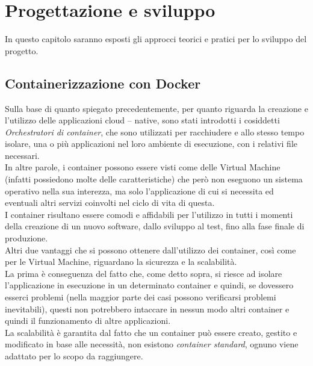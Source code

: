\chapter{Progettazione e sviluppo}\label{chap:progettazionesviluppo}
In questo capitolo saranno esposti gli approcci teorici e pratici per lo sviluppo del progetto.

\section{Containerizzazione con Docker}\label{sec:ContDocker}
Sulla base di quanto spiegato precedentemente, per quanto riguarda la creazione e l'utilizzo delle applicazioni cloud – native, sono stati introdotti i cosiddetti \emph{Orchestratori di container}, che sono utilizzati per racchiudere e allo stesso tempo isolare, una o più applicazioni nel loro ambiente di esecuzione, con i relativi file necessari.\\
In altre parole, i container possono essere visti come delle Virtual Machine (infatti possiedono molte delle caratteristiche) che però non eseguono un sistema operativo nella sua interezza, ma solo l'applicazione di cui si necessita ed eventuali altri servizi coinvolti nel ciclo di vita di questa.\\
I container risultano essere comodi e affidabili per l'utilizzo in tutti i momenti della creazione di un nuovo software, dallo sviluppo al test, fino alla fase finale di produzione.\\
Altri due vantaggi che si possono ottenere dall'utilizzo dei container, così come per le Virtual Machine, riguardano la sicurezza e la scalabilità.\\
La prima è conseguenza del fatto che, come detto sopra, si riesce ad isolare l'applicazione in esecuzione in un determinato container e quindi, se dovessero esserci problemi (nella maggior parte dei casi possono verificarsi problemi inevitabili), questi non potrebbero intaccare in nessun modo altri container e quindi il funzionamento di altre applicazioni.\\
La scalabilità è garantita dal fatto che un container può essere creato, gestito e modificato in base alle necessità, non esistono \emph{container standard}, ognuno viene adattato per lo scopo da raggiungere.\\

